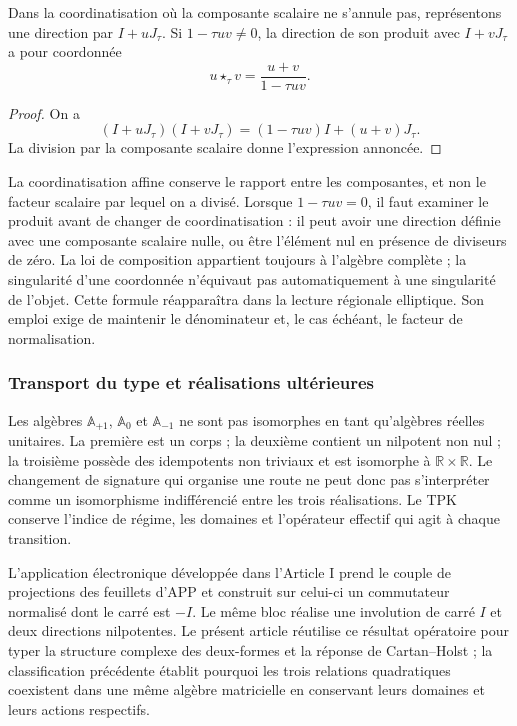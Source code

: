 \begin{proposition}
\label{trit-ampl-prop-pendientes}
Dans la coordinatisation où la composante scalaire ne s'annule pas, représentons une
direction par \(I+uJ_\tau\). Si \(1-\tau uv\ne0\), la direction de son
produit avec \(I+vJ_\tau\) a pour coordonnée
\[
 u\star_\tau v=\frac{u+v}{1-\tau uv}.
\]
\end{proposition}
\begin{proof}
On a
\[
 (I+uJ_\tau)(I+vJ_\tau)
   =(1-\tau uv)I+(u+v)J_\tau.
\]
La division par la composante scalaire donne l'expression annoncée.
\end{proof}

La coordinatisation affine conserve le rapport entre les composantes, et non le facteur scalaire
par lequel on a divisé. Lorsque \(1-\tau uv=0\), il faut examiner le produit avant de
changer de coordinatisation : il peut avoir une direction définie avec une composante scalaire
nulle, ou être l'élément nul en présence de diviseurs de zéro. La loi de
composition appartient toujours à l'algèbre complète ; la singularité d'une
coordonnée n'équivaut pas automatiquement à une singularité de l'objet.
Cette formule réapparaîtra dans la lecture régionale elliptique. Son emploi exige
de maintenir le dénominateur et, le cas échéant, le facteur de normalisation.

\subsubsection{Transport du type et réalisations ultérieures}
\label{trit-ampl-puentes}

Les algèbres \(\mathbb A_{+1}\), \(\mathbb A_0\) et
\(\mathbb A_{-1}\) ne sont pas isomorphes en tant qu'algèbres réelles unitaires.
La première est un corps ; la deuxième contient un nilpotent non nul ; la
troisième possède des idempotents non triviaux et est isomorphe à
\(\mathbb R\times\mathbb R\). Le changement de signature qui organise une
route ne peut donc pas s'interpréter comme un isomorphisme indifférencié entre les
trois réalisations. Le TPK conserve l'indice de régime, les domaines et
l'opérateur effectif qui agit à chaque transition.

L'application électronique développée dans l'Article I prend le couple de
projections des feuillets d'APP et construit sur celui-ci un commutateur
normalisé dont le carré est \(-I\). Le même bloc réalise une involution de
carré \(I\) et deux directions nilpotentes. Le présent article réutilise
ce résultat opératoire pour typer la structure complexe des deux-formes
et la réponse de Cartan--Holst ; la classification précédente établit
pourquoi les trois relations quadratiques coexistent dans une même algèbre matricielle
en conservant leurs domaines et leurs actions respectifs.

